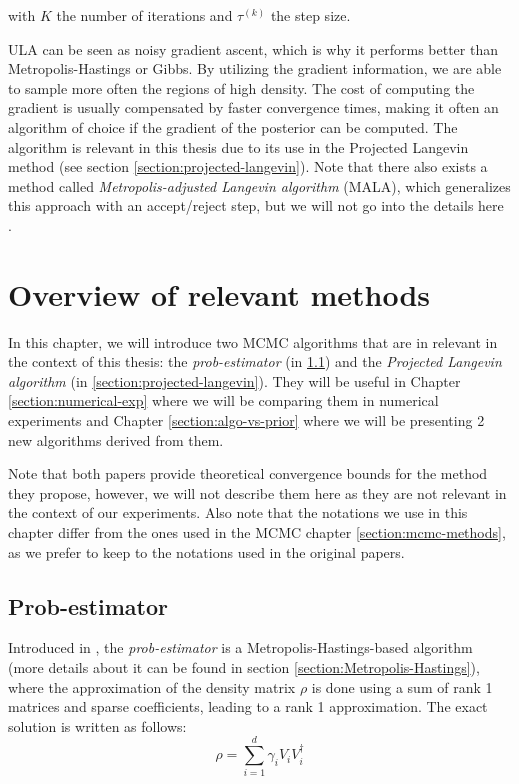 \documentclass[12pt]{memoir}
\newcommand{\ti}{\textit}
\begin{document}
with $K$ the number of iterations and $\tau^{(k)}$ the step size.  \medbreak


ULA can be seen as noisy gradient ascent, which is why it performs better than Metropolis-Hastings or Gibbs. By utilizing the gradient information, we are able to sample more often the regions of high density. The cost of computing the gradient is usually compensated by faster convergence times, making it often an algorithm of choice if the gradient of the posterior can be computed. The algorithm is relevant in this thesis due to its use in the Projected Langevin method (see section \ref{section:projected-langevin}). Note that there also exists a method called \textit{Metropolis-adjusted Langevin algorithm} (MALA), which generalizes this approach with an accept/reject step, but we will not go into the details here \cite{mcmc:langenvin-blog:Ansari2024Apr, wiki:MALA}.


\chapter{Overview of relevant methods} \label{section:relevant-methods}

In this chapter, we will introduce two MCMC algorithms that are in relevant in the context of this thesis: the \ti{prob-estimator} (in \ref{section:prob-estimator}) and the \ti{Projected Langevin algorithm} (in \ref{section:projected-langevin}). They will be useful in Chapter \ref{section:numerical-exp} where we will be comparing them in numerical experiments and Chapter \ref{section:algo-vs-prior} where we will be presenting 2 new algorithms derived from them.\medbreak


Note that both papers provide theoretical convergence bounds for the method they propose, however, we will not describe them here as they are not relevant in the context of our experiments. Also note that the notations we use in this chapter differ from the ones used in the MCMC chapter \ref{section:mcmc-methods}, as we prefer to keep to the notations used in the original papers.


\section{Prob-estimator}\label{section:prob-estimator}

Introduced in \cite{MA17}, the \textit{prob-estimator} is a Metropolis-Hastings-based algorithm (more details about it can be found in section \ref{section:Metropolis-Hastings}), where the approximation of the density matrix $\rho$ is done using a sum of rank 1 matrices and sparse coefficients, leading to a rank 1 approximation. The exact solution is written as follows:
\begin{equation}\label{eq:rank1-approx}
    \rho = \sum_{i=1}^d \gamma_i V_i V_i^\dagger
\end{equation}
\end{document}

